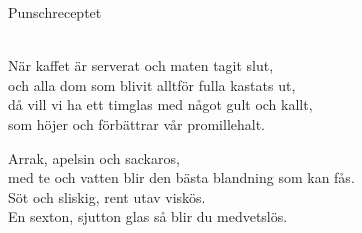 \begin{song}{Punschreceptet}

	
	\\
	
	När kaffet är serverat och maten tagit slut,\\
	och alla dom som blivit alltför fulla kastats ut,\\
	då vill vi ha ett timglas med något gult och kallt,\\
	som höjer och förbättrar vår promillehalt.\\
	\begin{repetition}	
		Arrak, apelsin och sackaros,\\
		med te och vatten blir den bästa blandning som kan fås.\\
		Söt och sliskig, rent utav viskös.\\
		En sexton, sjutton glas så blir du medvetslös.
	\end{repetition}

	
\end{song}
